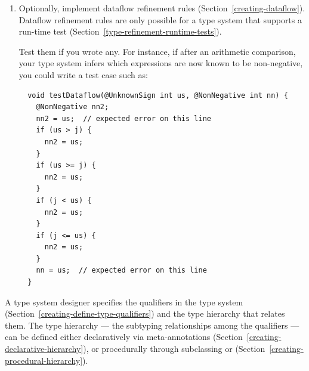 \begin{enumerate}
  Test your type introduction rules.
  For example, if your type system sets the qualifier for manifest literal
  integers and for array lengths, you would write a test case like the following:

\begin{Verbatim}
  void testTypeIntroduction(String[] myArray) {
    @NonNegative nn1 = -1;  // expected error on this line
    @NonNegative nn2 = 0;
    @NonNegative nn3 = 1;
    @NonNegative nn4 = myArray.length;
  }
\end{Verbatim}

\item
  Optionally, implement dataflow refinement rules
  (Section~\ref{creating-dataflow}).
  Dataflow refinement rules are only possible for a type system that
  supports a run-time test (Section~\ref{type-refinement-runtime-tests}).

  Test them if you wrote any.
  For instance, if after an arithmetic comparison, your type system infers
  which expressions are now known to be non-negative, you could write a
  test case such as:

\begin{Verbatim}
  void testDataflow(@UnknownSign int us, @NonNegative int nn) {
    @NonNegative nn2;
    nn2 = us;  // expected error on this line
    if (us > j) {
      nn2 = us;
    }
    if (us >= j) {
      nn2 = us;
    }
    if (j < us) {
      nn2 = us;
    }
    if (j <= us) {
      nn2 = us;
    }
    nn = us;  // expected error on this line
  }
\end{Verbatim}

\end{enumerate}





A type system designer specifies the qualifiers in the type system (Section~\ref{creating-define-type-qualifiers})
and
the type hierarchy that relates them.
The type hierarchy --- the subtyping relationships among the qualifiers ---
can be defined either
declaratively via meta-annotations (Section~\ref{creating-declarative-hierarchy}), or procedurally through
subclassing  or
 (Section~\ref{creating-procedural-hierarchy}).




